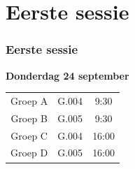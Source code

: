 \section{Eerste sessie}
\begin{frame}
	\frametitle{Eerste sessie}
	\textbf{Donderdag 24 september}\\
	\vspace{1cm}
	
	\begin{center}
	\begin{tabular}{c|c|c}
    Groep A & G.004 & 9:30\\
    Groep B & G.005 & 9:30\\ \hline
    Groep C & G.004 & 16:00\\
    Groep D & G.005 & 16:00
    \end{tabular}
	\end{center}
    
\end{frame}







